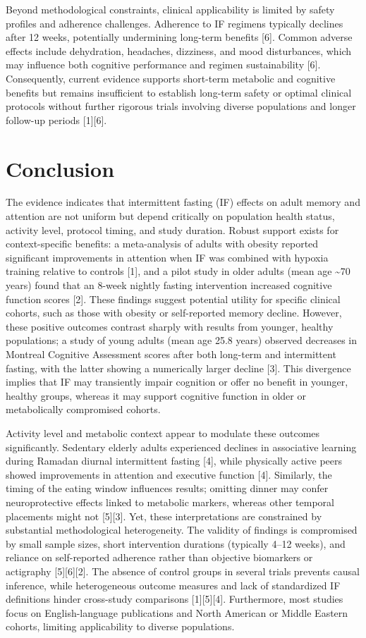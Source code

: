 \documentclass[conference]{IEEEtran}
\begin{document}
Beyond methodological constraints, clinical applicability is limited by safety profiles and adherence challenges. Adherence to IF regimens typically declines after 12 weeks, potentially undermining long-term benefits [6]. Common adverse effects include dehydration, headaches, dizziness, and mood disturbances, which may influence both cognitive performance and regimen sustainability [6]. Consequently, current evidence supports short-term metabolic and cognitive benefits but remains insufficient to establish long-term safety or optimal clinical protocols without further rigorous trials involving diverse populations and longer follow-up periods [1][6].

\section{Conclusion}
The evidence indicates that intermittent fasting (IF) effects on adult memory and attention are not uniform but depend critically on population health status, activity level, protocol timing, and study duration. Robust support exists for context-specific benefits: a meta-analysis of adults with obesity reported significant improvements in attention when IF was combined with hypoxia training relative to controls [1], and a pilot study in older adults (mean age \textasciitilde{}70 years) found that an 8-week nightly fasting intervention increased cognitive function scores [2]. These findings suggest potential utility for specific clinical cohorts, such as those with obesity or self-reported memory decline. However, these positive outcomes contrast sharply with results from younger, healthy populations; a study of young adults (mean age 25.8 years) observed decreases in Montreal Cognitive Assessment scores after both long-term and intermittent fasting, with the latter showing a numerically larger decline [3]. This divergence implies that IF may transiently impair cognition or offer no benefit in younger, healthy groups, whereas it may support cognitive function in older or metabolically compromised cohorts.

Activity level and metabolic context appear to modulate these outcomes significantly. Sedentary elderly adults experienced declines in associative learning during Ramadan diurnal intermittent fasting [4], while physically active peers showed improvements in attention and executive function [4]. Similarly, the timing of the eating window influences results; omitting dinner may confer neuroprotective effects linked to metabolic markers, whereas other temporal placements might not [5][3]. Yet, these interpretations are constrained by substantial methodological heterogeneity. The validity of findings is compromised by small sample sizes, short intervention durations (typically 4–12 weeks), and reliance on self-reported adherence rather than objective biomarkers or actigraphy [5][6][2]. The absence of control groups in several trials prevents causal inference, while heterogeneous outcome measures and lack of standardized IF definitions hinder cross-study comparisons [1][5][4]. Furthermore, most studies focus on English-language publications and North American or Middle Eastern cohorts, limiting applicability to diverse populations.
\end{document}
